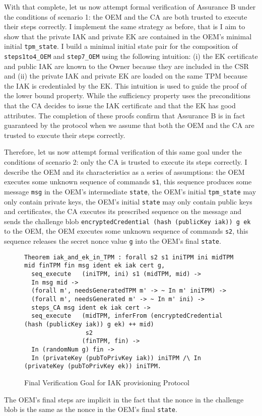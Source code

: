 With that complete, let us now attempt formal verification of Assurance B under the conditions of scenario 1: the OEM and the CA are both trusted to execute their steps correctly. I implement the same strategy as before, that is I aim to show that the private IAK and private EK are contained in the OEM's minimal initial \verb|tpm_state|. I build a minimal initial state pair for the composition of \verb|steps1to4_OEM| and \verb|step7_OEM| using the following intuition: (i) the EK certificate and public IAK are known to the Owner because they are included in the CSR and (ii) the private IAK and private EK are loaded on the same TPM because the IAK is credentialed by the EK. This intuition is used to guide the proof of the lower bound property. While the sufficiency property uses the preconditions that the CA decides to issue the IAK certificate and that the EK has good attributes. The completion of these proofs confirm that Assurance B is in fact guaranteed by the protocol when we assume that both the OEM and the CA are trusted to execute their steps correctly.

Therefore, let us now attempt formal verification of this same goal under the conditions of scenario 2: only the CA is trusted to execute its steps correctly. 
I describe the OEM and its characteristics as a series of assumptions: the OEM executes some unknown sequence of commands \verb|s1|, this sequence produces some message \verb|msg| in the OEM's intermediate \verb|state|, the OEM's initial \verb|tpm_state| may only contain private keys, the OEM's initial \verb|state| may only contain public keys and certificates, the CA executes its prescribed sequence on the message and sends the challenge blob \verb|encryptedCredential (hash (publicKey iak)) g ek| to the OEM, the OEM executes some unknown sequence of commands \verb|s2|, this sequence releases the secret nonce value \verb|g| into the OEM's final \verb|state|. 
\begin{figure}[h]
\begin{lstlisting}[language=Coq]
Theorem iak_and_ek_in_TPM : forall s2 s1 iniTPM ini midTPM mid finTPM fin msg ident ek iak cert g,
  seq_execute   (iniTPM, ini) s1 (midTPM, mid) -> 
  In msg mid ->
  (forall m', needsGeneratedTPM m' -> ~ In m' iniTPM) ->
  (forall m', needsGenerated m' -> ~ In m' ini) ->
  steps_CA msg ident ek iak cert ->
  seq_execute   (midTPM, inferFrom (encryptedCredential (hash (publicKey iak)) g ek) ++ mid) 
                 s2 
                (finTPM, fin) ->
  In (randomNum g) fin ->
  In (privateKey (pubToPrivKey iak)) iniTPM /\ In (privateKey (pubToPrivKey ek)) iniTPM.
\end{lstlisting}
\caption{Final Verification Goal for IAK provisioning Protocol}
\label{fig:iak_goal}
\end{figure}
The OEM's final steps are implicit in the fact that the nonce in the challenge blob is the same as the nonce in the OEM's final \verb|state|. 


